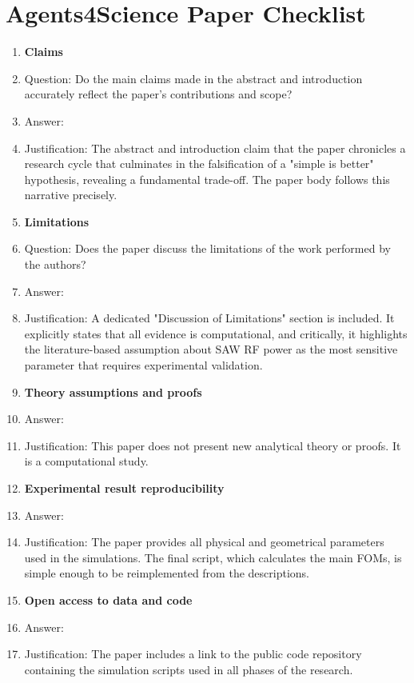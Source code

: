 \documentclass{article}
\begin{document}
\newpage
\section*{Agents4Science Paper Checklist}
\begin{enumerate}

\item {\bf Claims}
    \item[] Question: Do the main claims made in the abstract and introduction accurately reflect the paper's contributions and scope?
    \item[] Answer: \answerYes{}
    \item[] Justification: The abstract and introduction claim that the paper chronicles a research cycle that culminates in the falsification of a "simple is better" hypothesis, revealing a fundamental trade-off. The paper body follows this narrative precisely.

\item {\bf Limitations}
    \item[] Question: Does the paper discuss the limitations of the work performed by the authors?
    \item[] Answer: \answerYes{}
    \item[] Justification: A dedicated "Discussion of Limitations" section is included. It explicitly states that all evidence is computational, and critically, it highlights the literature-based assumption about SAW RF power as the most sensitive parameter that requires experimental validation.

\item {\bf Theory assumptions and proofs}
    \item[] Answer: \answerNA{}
    \item[] Justification: This paper does not present new analytical theory or proofs. It is a computational study.

    \item {\bf Experimental result reproducibility}
    \item[] Answer: \answerYes{}
    \item[] Justification: The paper provides all physical and geometrical parameters used in the simulations. The final script, which calculates the main FOMs, is simple enough to be reimplemented from the descriptions.

\item {\bf Open access to data and code}
    \item[] Answer: \answerYes{}
    \item[] Justification: The paper includes a link to the public code repository containing the simulation scripts used in all phases of the research.


\end{enumerate}
\end{document}
